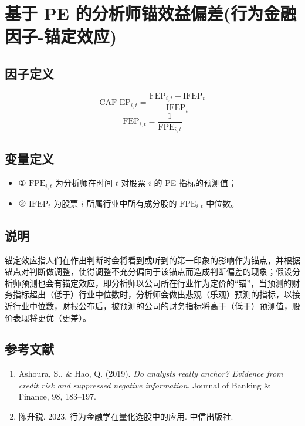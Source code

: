 \documentclass{article}
\begin{document}
\section{基于 PE 的分析师锚效益偏差(行为金融因子-锚定效应)}

\subsection{因子定义}

\begin{equation}
    \mathrm{CAF\_EP}_{i,t} = \frac{\mathrm{FEP}_{i,t} - \mathrm{IFEP}_t}{\mathrm{IFEP}_t}
\end{equation}
\begin{equation}
    \mathrm{FEP}_{i,t} = \frac{1}{\mathrm{FPE}_{i,t}}
\end{equation}

\subsection{变量定义}
\begin{itemize}
    \item ① \( \mathrm{FPE}_{i,t} \) 为分析师在时间 \( t \) 对股票 \( i \) 的 PE 指标的预测值；
    \item ② \( \mathrm{IFEP}_t \) 为股票 \( i \) 所属行业中所有成分股的 \( \mathrm{FPE}_{i,t} \) 中位数。
\end{itemize}

\subsection{说明}
锚定效应指人们在作出判断时会将看到或听到的第一印象的影响作为锚点，并根据锚点对判断做调整，使得调整不充分偏向于该锚点而造成判断偏差的现象；假设分析师预测也会有锚定效应，即分析师以公司所在行业作为定价的“锚”，当预测的财务指标超出（低于）行业中位数时，分析师会做出悲观（乐观）预测的指标，以接近行业中位数，财报公布后，被预测的公司的财务指标将高于（低于）预测值，股价表现将更优（更差）。

\subsection{参考文献}
\begin{enumerate}
    \item Ashoura, S., \& Hao, Q. (2019). \textit{Do analysts really anchor? Evidence from credit risk and suppressed negative information}. Journal of Banking \& Finance, 98, 183–197.
    \item 陈升锐. 2023. 行为金融学在量化选股中的应用. 中信出版社.
\end{enumerate}
\end{document}
